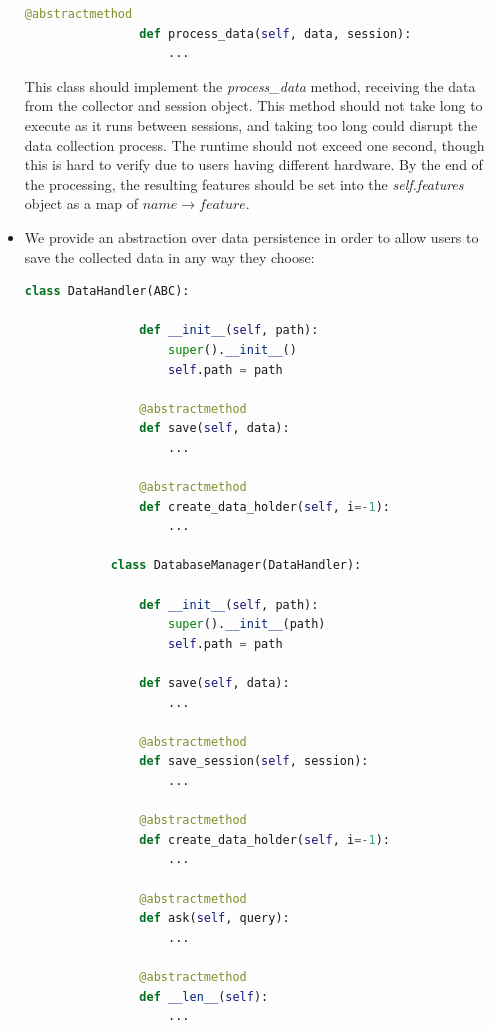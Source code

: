 \documentclass[../main.tex]{subfiles}
\begin{document}
\begin{itemize}
\begin{lstlisting}[language=Python]
                @abstractmethod
                def process_data(self, data, session):
                    ...
        \end{lstlisting}
        This class should implement the \textit{process\_data} method, receiving the data from the collector and session object. 
        This method should not take long to execute as it runs between sessions, and taking too long could disrupt the data collection process. 
        The runtime should not exceed one second, though this is hard to verify due to users having different hardware. 
        By the end of the processing, the resulting features should be set into the \textit{self.features} object as a map of $name \rightarrow feature$.
    \item We provide an abstraction over data persistence in order to allow users to save the collected data in any way they choose:
        \begin{lstlisting}[language=Python]
            class DataHandler(ABC):

                def __init__(self, path):
                    super().__init__()
                    self.path = path

                @abstractmethod
                def save(self, data):
                    ...

                @abstractmethod
                def create_data_holder(self, i=-1):
                    ...

            class DatabaseManager(DataHandler):

                def __init__(self, path):
                    super().__init__(path)
                    self.path = path
            
                def save(self, data):
                    ...
            
                @abstractmethod
                def save_session(self, session):
                    ...
            
                @abstractmethod
                def create_data_holder(self, i=-1):
                    ...
            
                @abstractmethod
                def ask(self, query):
                    ...
            
                @abstractmethod
                def __len__(self):
                    ...
            

\end{lstlisting}
\end{itemize}
\end{document}
